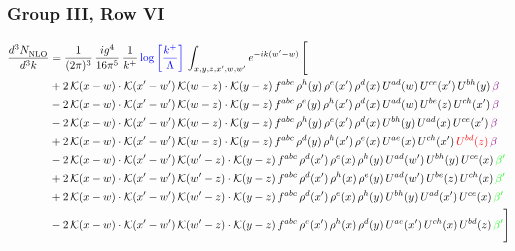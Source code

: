 \documentclass[9pt]{article}
\numberwithin{equation}{section}
\begin{document}
\subsubsection{Group III, Row VI}
\begin{align}
     \frac{d^{3}N_{\rm NLO}^{\rm}}{d^{3}k}  & = \frac{1}{(2\pi)^{3}}\, \frac{ig^{4}}{16\pi^{5}}\, \frac{1}{k^{+}}\, {\color{blue}\log{\left[\frac{k^{+}}{\Lambda}\right]}}\,\int_{x,y,z,x^{\prime},w,w^{\prime}}e^{-ik(w^{\prime}-w)}\, \Bigg[\notag \\ & +2\,\mathcal{K}(x-w)\cdot\mathcal{K}(x'-w')\,\mathcal{K}(w-z)\cdot\mathcal{K}(y-z)\, f^{abc}\,\rho^{h}(y)\,\rho^{e}(x')\,\rho^{d}(x)\,U^{ad}(w)\,U^{ce}(x')\,U^{bh}(y)\,{\color{violet} \beta}\notag\\ &-2\,\mathcal{K}(x-w)\cdot\mathcal{K}(x'-w')\,\mathcal{K}(w-z)\cdot\mathcal{K}(y-z)\, f^{abc}\,\rho^{e}(y)\,\rho^{h}(x')\,\rho^{d}(x)\,U^{ad}(w)\,U^{be}(z)\,U^{ch}(x')\,{\color{violet} \beta}\notag \\ &-2\,\mathcal{K}(x-w)\cdot\mathcal{K}(x'-w')\,\mathcal{K}(w-z)\cdot\mathcal{K}(y-z)\, f^{abc}\,\rho^{h}(y)\,\rho^{e}(x')\,\rho^{d}(x)\,U^{bh}(y)\,U^{ad}(x)\,U^{ce}(x')\,{\color{violet} \beta}\notag\\ & +2\,\mathcal{K}(x-w)\cdot\mathcal{K}(x'-w')\,\mathcal{K}(w-z)\cdot\mathcal{K}(y-z)\, f^{abc}\,\rho^{d}(y)\,\rho^{h}(x')\,\rho^{e}(x)\,U^{ae}(x)\,U^{ch}(x')\,{\color{red}U^{bd}(z)}\,{\color{violet} \beta}\notag\\ & -2\, \mathcal{K}(x-w) \cdot \mathcal{K}(x'-w')\, \mathcal{K}(w'-z) \cdot \mathcal{K}(y-z)\, f^{abc}\, \rho^{d}(x')\,\rho^{e}(x)\, \rho^{h}(y)\,U^{ad}(w')\,U^{bh}(y)\,U^{ce}(x)\, {\color{green} \beta'}\notag \\ & + 2\, \mathcal{K}(x-w) \cdot \mathcal{K}(x'-w')\, \mathcal{K}(w'-z) \cdot \mathcal{K}(y-z)\, f^{abc}\, \rho^{d}(x')\,\rho^{h}(x)\, \rho^{e}(y)\,U^{ad}(w')\,U^{be}(z)\,U^{ch}(x)\, {\color{green} \beta'}\notag \\ & +2\, \mathcal{K}(x-w) \cdot \mathcal{K}(x'-w')\, \mathcal{K}(w'-z) \cdot \mathcal{K}(y-z)\, f^{abc}\, \rho^{d}(x')\,\rho^{e}(x)\, \rho^{h}(y)\,U^{bh}(y)\,U^{ad}(x')\,U^{ce}(x)\, {\color{green} \beta'}\notag \\ & -2\, \mathcal{K}(x-w) \cdot \mathcal{K}(x'-w')\, \mathcal{K}(w'-z) \cdot \mathcal{K}(y-z)\, f^{abc}\, \rho^{e}(x')\,\rho^{h}(x)\, \rho^{d}(y)\,U^{ae}(x')\,U^{ch}(x)\,U^{bd}(z)\, {\color{green} \beta'}\Bigg]
\end{align}  
\end{document}

